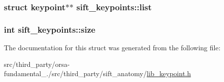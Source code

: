 \subsubsection[{list}]{\setlength{\rightskip}{0pt plus 5cm}struct {\bf keypoint}$\ast$$\ast$ sift\+\_\+keypoints\+::list}\label{structsift__keypoints_af36e8401081943dce149df4d9b655ba3}
\hypertarget{structsift__keypoints_a41f37d9e8c97c414865381920c277b36}{}
\subsubsection[{size}]{\setlength{\rightskip}{0pt plus 5cm}int sift\+\_\+keypoints\+::size}\label{structsift__keypoints_a41f37d9e8c97c414865381920c277b36}


The documentation for this struct was generated from the following file\+:\begin{DoxyCompactItemize}
\item 
src/third\+\_\+party/orsa-\/fundamental\+\_./src/third\+\_\+party/sift\+\_\+anatomy/\hyperlink{lib__keypoint_8h}{lib\+\_\+keypoint.\+h}\end{DoxyCompactItemize}

